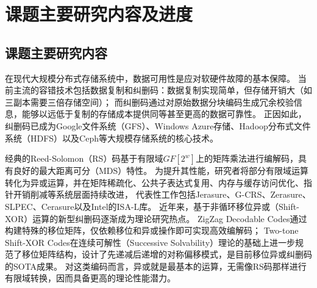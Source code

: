 \section{课题主要研究内容及进度}

\subsection{课题主要研究内容}

在现代大规模分布式存储系统中，数据可用性是应对软硬件故障的基本保障\cite{fordAvailabilityGloballyDistributed2010}。
当前主流的容错技术包括数据复制和纠删码：数据复制实现简单，但存储开销大（如三副本需要三倍存储空间）；
而纠删码通过对原始数据分块编码生成冗余校验信息，能够以远低于复制的存储成本提供同等甚至更高的数据可靠性\cite{weatherspoonErasureCodingVs2002}。
正因如此，纠删码已成为Google文件系统（GFS）\cite{ghemawatGoogleFileSystem2003}、Windows Azure存储\cite{calderWindowsAzureStorage2011}、Hadoop分布式文件系统（HDFS）\cite{shvachkoHadoopDistributedFile2010}以及Ceph\cite{weilCephScalableHighPerformance2006}等大规模存储系统的核心技术。

经典的Reed-Solomon（RS）码\cite{reedPolynomialCodesCertain1960}基于有限域$GF[2^w]$上的矩阵乘法进行编解码，具有良好的最大距离可分（MDS）特性。
为提升其性能，研究者将部分有限域运算转化为异或运算\cite{lubyXORBasedErasureResilientCoding1995}，并在矩阵稀疏化、公共子表达式复用、内存与缓存访问优化、指针开销削减等系统层面持续改进，
代表性工作包括Jerasure\cite{plankJerasureLibraryFacilitating2008}、G-CRS\cite{liuGCRSGPUAccelerated2018}、Zerasure\cite{zhouFastErasureCoding2020}、SLPEC\cite{uezatoAcceleratingXORbasedErasure2021}、Cerasure\cite{wangFastAccelerationStrategies2025}以及Intel的ISA-L库\cite{gajalwarExploringDataProtection2024}。
近年来，基于非循环移位异或（Shift-XOR）运算的新型纠删码逐渐成为理论研究热点。
ZigZag Decodable Codes\cite{gongZigzagDecodableCodes2017}通过构建特殊的移位矩阵，仅依赖移位和异或操作即可实现高效编解码；
Two-tone Shift-XOR Codes\cite{fuTwotoneShiftXORStorage2021}在连续可解性（Successive Solvability）理论\cite{chengSuccessivelySolvableShiftAdd2021}的基础上进一步规范了移位矩阵结构，设计了先递减后递增的对称偏移模式，是目前移位异或纠删码的SOTA成果。
对这类编码而言，异或就是最基本的运算，无需像RS码那样进行有限域转换，因而具备更高的理论性能潜力。

